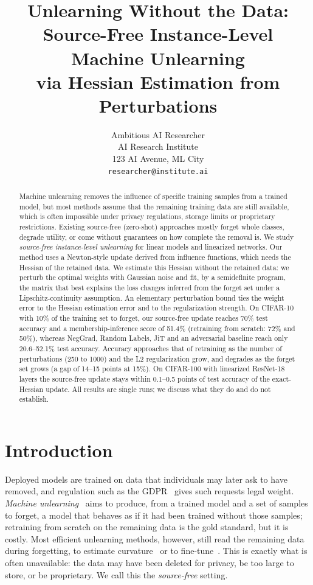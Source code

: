 \documentclass[10pt,twocolumn,letterpaper]{article}
\title{Unlearning Without the Data: Source-Free Instance-Level Machine Unlearning\\via Hessian Estimation from Perturbations}
\author{Ambitious AI Researcher\\
AI Research Institute\\
123 AI Avenue, ML City\\
{\tt\small researcher@institute.ai}
}
\begin{document}
\maketitle

\begin{abstract}
Machine unlearning removes the influence of specific training samples from a trained model, but most methods assume that the remaining training data are still available, which is often impossible under privacy regulations, storage limits or proprietary restrictions.
Existing source-free (zero-shot) approaches mostly forget whole classes, degrade utility, or come without guarantees on how complete the removal is.
We study \emph{source-free instance-level unlearning} for linear models and linearized networks.
Our method uses a Newton-style update derived from influence functions, which needs the Hessian of the retained data.
We estimate this Hessian without the retained data: we perturb the optimal weights with Gaussian noise and fit, by a semidefinite program, the matrix that best explains the loss changes inferred from the forget set under a Lipschitz-continuity assumption.
An elementary perturbation bound ties the weight error to the Hessian estimation error and to the regularization strength.
On CIFAR-10 with 10\% of the training set to forget, our source-free update reaches 70\% test accuracy and a membership-inference score of 51.4\% (retraining from scratch: 72\% and 50\%), whereas NegGrad, Random Labels, JiT and an adversarial baseline reach only 20.6--52.1\% test accuracy.
Accuracy approaches that of retraining as the number of perturbations (250 to 1000) and the L2 regularization grow, and degrades as the forget set grows (a gap of 14--15 points at 15\%).
On CIFAR-100 with linearized ResNet-18 layers the source-free update stays within 0.1--0.5 points of test accuracy of the exact-Hessian update.
All results are single runs; we discuss what they do and do not establish.
\end{abstract}

\section{Introduction}
\label{sec:intro}
Deployed models are trained on data that individuals may later ask to have removed, and regulation such as the GDPR~\cite{gdpr2016} gives such requests legal weight.
\emph{Machine unlearning}~\cite{cao2015towards,bourtoule2021machine,xu2023machine} aims to produce, from a trained model and a set of samples to forget, a model that behaves as if it had been trained without those samples; retraining from scratch on the remaining data is the gold standard, but it is costly.
Most efficient unlearning methods, however, still read the remaining data during forgetting, to estimate curvature~\cite{guo2020certified,golatkar2020eternal,mehta2022deep} or to fine-tune~\cite{kurmanji2023towards}.
This is exactly what is often unavailable: the data may have been deleted for privacy, be too large to store, or be proprietary.
We call this the \emph{source-free} setting.
\end{document}
